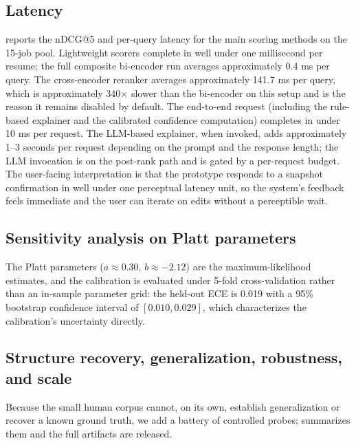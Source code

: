 \subsection{Latency}\label{sec:5.5}
 reports the nDCG@5 and per-query latency for the main scoring methods on the 15-job pool.
Lightweight scorers complete in well under one millisecond per resume; the full composite bi-encoder run averages approximately 0.4 ms per query.
The cross-encoder reranker averages approximately 141.7 ms per query, which is approximately 340$\times$ slower than the bi-encoder on this setup and is the reason it remains disabled by default.
The end-to-end request (including the rule-based explainer and the calibrated confidence computation) completes in under 10 ms per request.
The LLM-based explainer, when invoked, adds approximately 1--3 seconds per request depending on the prompt and the response length; the LLM invocation is on the post-rank path and is gated by a per-request budget.
The user-facing interpretation is that the prototype responds to a snapshot confirmation in well under one perceptual latency unit, so the system's feedback feels immediate and the user can iterate on edits without a perceptible wait.



\subsection{Sensitivity analysis on Platt parameters}\label{sec:5.6}
The Platt parameters ($a \approx 0.30$, $b \approx -2.12$) are the maximum-likelihood estimates, and the calibration is evaluated under 5-fold cross-validation rather than an in-sample parameter grid: the held-out ECE is 0.019 with a 95\% bootstrap confidence interval of $[0.010, 0.029]$, which characterizes the calibration's uncertainty directly.

\subsection{Structure recovery, generalization, robustness, and scale}\label{sec:5.7}
Because the small human corpus cannot, on its own, establish generalization or recover a known
ground truth, we add a battery of controlled probes;  summarizes them and the
full artifacts are released.

